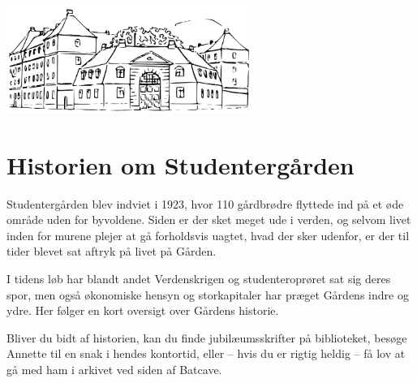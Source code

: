 \documentclass[11pt,article,twoside,openany,danish,extrafontsizes]{memoir} %
\begin{document}
\begin{center}

\vfill
\includegraphics[width=0.6\textwidth]{fig/gaarden-tegning}

\end{center}



\clearpage


\chapter{Historien om Studentergården}
\label{chap:historie}
Studentergården blev indviet i 1923, hvor 110 gårdbrødre flyttede ind på et øde område uden for byvoldene. Siden er der sket meget ude i verden, og selvom livet inden for murene plejer at gå forholdsvis uagtet, hvad der sker udenfor, er der til tider blevet sat aftryk på livet på Gården.

I tidens løb har blandt andet Verdenskrigen og studenteroprøret sat sig deres spor, men også økonomiske hensyn og storkapitaler har præget Gårdens indre og ydre. Her følger en kort oversigt over Gårdens historie.

Bliver du bidt af historien, kan du finde jubilæumsskrifter på biblioteket, besøge Annette til en snak i hendes kontortid, eller -- hvis du er rigtig heldig -- få lov at gå med ham i arkivet ved siden af Batcave.
\end{document}
